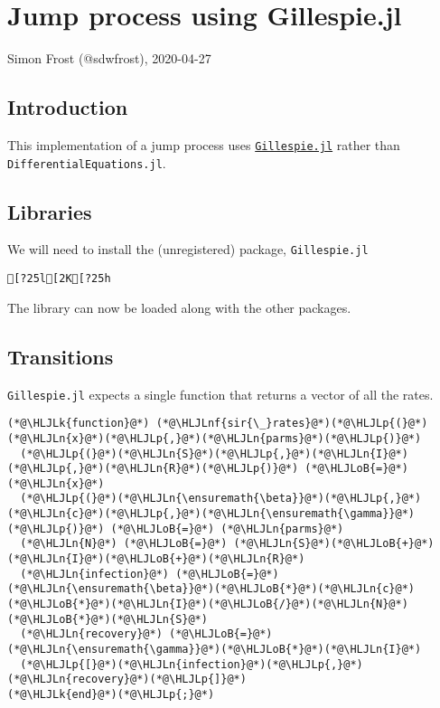 \documentclass[12pt,a4paper]{article}
\newcommand{\HLJLk}[1]{\textcolor[RGB]{148,91,176}{\textbf{#1}}}
\newcommand{\HLJLn}[1]{#1}
\newcommand{\HLJLnf}[1]{\textcolor[RGB]{66,102,213}{#1}}
\newcommand{\HLJLoB}[1]{\textcolor[RGB]{102,102,102}{\textbf{#1}}}
\newcommand{\HLJLp}[1]{#1}
\begin{document}
\section{Jump process using Gillespie.jl}
Simon Frost (@sdwfrost), 2020-04-27

\subsection{Introduction}
This implementation of a jump process uses \href{https://github.com/sdwfrost/Gillespie.jl}{\texttt{Gillespie.jl}} rather than \texttt{DifferentialEquations.jl}.

\subsection{Libraries}
We will need to install the (unregistered) package, \texttt{Gillespie.jl}


\begin{lstlisting}
[?25l[2K[?25h
\end{lstlisting}


The library can now be loaded along with the other packages.



\subsection{Transitions}
\texttt{Gillespie.jl} expects a single function that returns a vector of all the rates.


\begin{lstlisting}
(*@\HLJLk{function}@*) (*@\HLJLnf{sir{\_}rates}@*)(*@\HLJLp{(}@*)(*@\HLJLn{x}@*)(*@\HLJLp{,}@*)(*@\HLJLn{parms}@*)(*@\HLJLp{)}@*)
  (*@\HLJLp{(}@*)(*@\HLJLn{S}@*)(*@\HLJLp{,}@*)(*@\HLJLn{I}@*)(*@\HLJLp{,}@*)(*@\HLJLn{R}@*)(*@\HLJLp{)}@*) (*@\HLJLoB{=}@*) (*@\HLJLn{x}@*)
  (*@\HLJLp{(}@*)(*@\HLJLn{\ensuremath{\beta}}@*)(*@\HLJLp{,}@*)(*@\HLJLn{c}@*)(*@\HLJLp{,}@*)(*@\HLJLn{\ensuremath{\gamma}}@*)(*@\HLJLp{)}@*) (*@\HLJLoB{=}@*) (*@\HLJLn{parms}@*)
  (*@\HLJLn{N}@*) (*@\HLJLoB{=}@*) (*@\HLJLn{S}@*)(*@\HLJLoB{+}@*)(*@\HLJLn{I}@*)(*@\HLJLoB{+}@*)(*@\HLJLn{R}@*)
  (*@\HLJLn{infection}@*) (*@\HLJLoB{=}@*) (*@\HLJLn{\ensuremath{\beta}}@*)(*@\HLJLoB{*}@*)(*@\HLJLn{c}@*)(*@\HLJLoB{*}@*)(*@\HLJLn{I}@*)(*@\HLJLoB{/}@*)(*@\HLJLn{N}@*)(*@\HLJLoB{*}@*)(*@\HLJLn{S}@*)
  (*@\HLJLn{recovery}@*) (*@\HLJLoB{=}@*) (*@\HLJLn{\ensuremath{\gamma}}@*)(*@\HLJLoB{*}@*)(*@\HLJLn{I}@*)
  (*@\HLJLp{[}@*)(*@\HLJLn{infection}@*)(*@\HLJLp{,}@*)(*@\HLJLn{recovery}@*)(*@\HLJLp{]}@*)
(*@\HLJLk{end}@*)(*@\HLJLp{;}@*)
\end{lstlisting}
\end{document}
